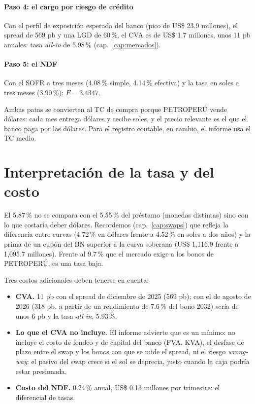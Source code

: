 \paragraph{Paso 4: el cargo por riesgo de crédito} Con el perfil de exposición esperada del banco (pico de US\$ 23.9 millones), el spread de 569 pb y una LGD de 60\,\%, el CVA es de US\$ 1.7 millones, unos 11 pb anuales: tasa \emph{all-in} de 5.98\,\% (cap.~\ref{cap:mercados}).

\paragraph{Paso 5: el NDF} Con el SOFR a tres meses (4.08\,\% simple, 4.14\,\% efectiva) y la tasa en soles a tres meses (3.90\,\%): $F=3.4347$.

\begin{importante}
Ambas patas se convierten al TC de compra porque PETROPERÚ vende dólares: cada mes entrega dólares y recibe soles, y el precio relevante es el que el banco paga por los dólares. Para el registro contable, en cambio, el informe usa el TC medio.
\end{importante}

\section{Interpretación de la tasa y del costo}

El 5.87\,\% no se compara con el 5.55\,\% del préstamo (monedas distintas) sino con lo que costaría deber dólares. Recordemos (cap.~\ref{cap:swaps}) que refleja la diferencia entre curvas (4.72\,\% en dólares frente a 4.52\,\% en soles a dos años) y la prima de un cupón del BN superior a la curva soberana (US\$ 1,116.9 frente a 1,095.7 millones). Frente al 9.7\,\% que el mercado exige a los bonos de PETROPERÚ, es una tasa baja.

Tres costos adicionales deben tenerse en cuenta:
\begin{itemize}
\item \textbf{CVA.} 11 pb con el spread de diciembre de 2025 (569 pb); con el de agosto de 2026 (318 pb, a partir de un rendimiento de 7.6\,\% del bono 2032) sería de unos 6 pb y la tasa \emph{all-in}, 5.93\,\%.
\item \textbf{Lo que el CVA no incluye.} El informe advierte que es un mínimo: no incluye el costo de fondeo y de capital del banco (FVA, KVA), el desfase de plazo entre el swap y los bonos con que se mide el spread, ni el riesgo \emph{wrong-way}: el pasivo del swap crece si el sol se deprecia, justo cuando la caja podría estar presionada.
\item \textbf{Costo del NDF.} 0.24\,\% anual, US\$ 0.13 millones por trimestre: el diferencial de tasas.
\end{itemize}

